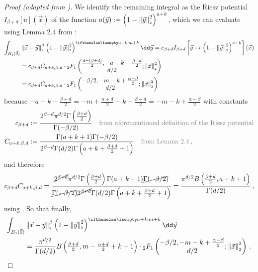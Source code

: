 \begin{proof}[Proof (adapted from \cite{2021-arbitrary-dimensions})]
  We identify the remaining integral as the Riesz potential $I_{\beta+d}[u](\vec{x})$ of the function $u(\vec{y}) := \left(1-\left\lVert\vec{y}\right\rVert_{\scriptscriptstyle 2}^2\right)^{a+k}$, which we can evaluate using Lemma 2.4 from \cite{2011-porous-medium-1}:
  \begin{align*}
    \int_{B_1(\vec{0})} & \norm{\vec{x}-\vec{y}}^\beta \weight[a+k]{y} \dd\vec{y} = c_{\beta+d} I_{\beta+d}\left[\vec{y} \mapsto \left(1-\norm{\vec{y}}^2\right)^{a+k}\right](\vec{x}) \\
                        & = c_{\beta+d} C_{a+k, \beta, d} \cdot {}_2F_1\left(\begin{matrix}\frac{d-(\beta+d)}{2}, -a-k-\frac{\beta+d}{2} \\d/2\end{matrix}; \norm{\vec{x}}^2\right)    \\
                        & = c_{\beta+d} C_{a+k, \beta, d} \cdot {}_2F_1\left(\begin{matrix}-\beta/2, -m-k+\frac{\alpha-\beta}{2} \\d/2\end{matrix}; \norm{\vec{x}}^2\right)
  \end{align*}
  because $-a-k-\frac{\beta+d}{2} = -m + \frac{\alpha+d}{2} -k - \frac{\beta+d}{2} = -m-k+\frac{\alpha-\beta}{2}$ with constants
  \begin{align*}
    c_{\beta+d}       & := \frac{2^{\beta+d} \pi^{d/2} \Gamma\left(\frac{\beta+d}{2}\right)}{\Gamma(-\beta/2)}                      \quad \text{\textcolor{gray}{from aforementioned definition of the Riesz potential}} \\
    C_{a+k, \beta, d} & := \frac{\Gamma(a+k+1) \Gamma(-\beta/2)}{2^{\beta+d}\Gamma(d/2) \Gamma\left(a+k+\frac{\beta+d}{2}+1\right)} \quad \text{\textcolor{gray}{from Lemma 2.4}}\,,
  \end{align*}
  and therefore
  $$c_{\beta+d} C_{a+k, \beta, d} = \frac{\cancel{2^{\beta+d}} \pi^{d/2} \Gamma\left(\frac{\beta+d}{2}\right) \Gamma(a+k+1) \cancel{\Gamma(-\beta/2)}}{\cancel{\Gamma(-\beta/2)} \cancel{2^{\beta+d}}\Gamma(d/2) \Gamma\left(a+k+\frac{\beta+d}{2}+1\right)} = \frac{\pi^{d/2}B\left(\tfrac{\beta+d}{2}, a+k+1\right)}{\Gamma(d/2)}\,,$$
  using .
  So that finally,
  \begin{align*}
    \int_{B_1(\vec{0})} & \norm{\vec{x}-\vec{y}}^\beta \weight[a+k]{y} \dd\vec{y}                                                                                                                                                         \\
                        & =\frac{\pi^{d/2}}{\Gamma(d/2)} B\left(\tfrac{\beta+d}{2}, m-\tfrac{\alpha+d}{2}+k+1\right) \cdot {}_2F_1\left(\begin{matrix}-\beta/2, -m-k+\frac{\alpha-\beta}{2} \\d/2\end{matrix}; \norm{\vec{x}}^2\right)\,.
  \end{align*}


\end{proof}
